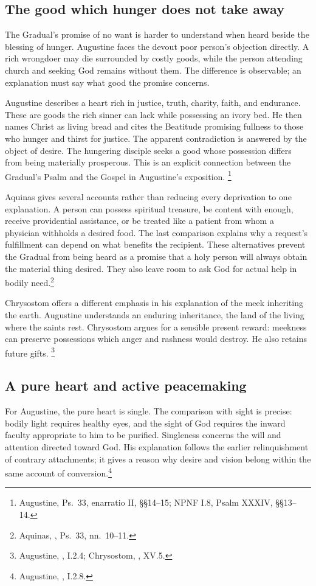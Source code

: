 \subsection{The good which hunger does not take away}
The Gradual's promise of no want is harder to understand when heard
beside the blessing of hunger. Augustine faces the devout poor person's
objection directly. A rich wrongdoer may die surrounded by costly goods,
while the person attending church and seeking God remains without
them. The difference is observable; an explanation must say what
good the promise concerns.

Augustine describes a heart rich in justice, truth, charity, faith,
and endurance. These are goods the rich sinner can lack while possessing
an ivory bed. He then names Christ as living bread and cites the
Beatitude promising fullness to those who hunger and thirst for justice.
The apparent contradiction is answered by the object of desire.
The hungering disciple seeks a good whose possession differs from
being materially prosperous. This is an explicit connection between
the Gradual's Psalm and the Gospel in Augustine's exposition.
\footnote{Augustine, Ps.~33, enarratio II, \S\S14--15;
NPNF I.8, Psalm XXXIV, \S\S13--14.}

Aquinas gives several accounts rather than reducing every deprivation
to one explanation. A person can possess spiritual treasure, be
content with enough, receive providential assistance, or be treated
like a patient from whom a physician withholds a desired food.
The last comparison explains why a request's fulfillment can depend
on what benefits the recipient. These alternatives prevent the
Gradual from being heard as a promise that a holy person will always
obtain the material thing desired. They also leave room to ask God
for actual help in bodily need.\footnote{Aquinas,
, Ps.~33, nn.~10--11.}

Chrysostom offers a different emphasis in his explanation of the meek
inheriting the earth. Augustine understands an enduring inheritance,
the land of the living where the saints rest. Chrysostom argues for
a sensible present reward: meekness can preserve possessions which
anger and rashness would destroy. He also retains future gifts.
\footnote{Augustine, ,
I.2.4; Chrysostom, , XV.5.}

\subsection{A pure heart and active peacemaking}
For Augustine, the pure heart is single. The comparison with sight is
precise: bodily light requires healthy eyes, and the sight of God
requires the inward faculty appropriate to him to be purified.
Singleness concerns the will and attention directed toward God.
His explanation follows the earlier relinquishment of contrary
attachments; it gives a reason why desire and vision belong within
the same account of conversion.\footnote{Augustine,
, I.2.8.}

